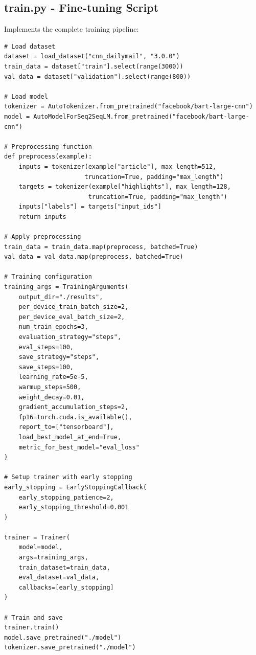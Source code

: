 \documentclass[12pt,a4paper,oneside]{report}
\begin{document}
\subsection{train.py - Fine-tuning Script}
Implements the complete training pipeline:
\begin{lstlisting}
# Load dataset
dataset = load_dataset("cnn_dailymail", "3.0.0")
train_data = dataset["train"].select(range(3000))
val_data = dataset["validation"].select(range(800))

# Load model
tokenizer = AutoTokenizer.from_pretrained("facebook/bart-large-cnn")
model = AutoModelForSeq2SeqLM.from_pretrained("facebook/bart-large-cnn")

# Preprocessing function
def preprocess(example):
    inputs = tokenizer(example["article"], max_length=512,
                      truncation=True, padding="max_length")
    targets = tokenizer(example["highlights"], max_length=128,
                       truncation=True, padding="max_length")
    inputs["labels"] = targets["input_ids"]
    return inputs

# Apply preprocessing
train_data = train_data.map(preprocess, batched=True)
val_data = val_data.map(preprocess, batched=True)

# Training configuration
training_args = TrainingArguments(
    output_dir="./results",
    per_device_train_batch_size=2,
    per_device_eval_batch_size=2,
    num_train_epochs=3,
    evaluation_strategy="steps",
    eval_steps=100,
    save_strategy="steps",
    save_steps=100,
    learning_rate=5e-5,
    warmup_steps=500,
    weight_decay=0.01,
    gradient_accumulation_steps=2,
    fp16=torch.cuda.is_available(),
    report_to=["tensorboard"],
    load_best_model_at_end=True,
    metric_for_best_model="eval_loss"
)

# Setup trainer with early stopping
early_stopping = EarlyStoppingCallback(
    early_stopping_patience=2,
    early_stopping_threshold=0.001
)

trainer = Trainer(
    model=model,
    args=training_args,
    train_dataset=train_data,
    eval_dataset=val_data,
    callbacks=[early_stopping]
)

# Train and save
trainer.train()
model.save_pretrained("./model")
tokenizer.save_pretrained("./model")
\end{lstlisting}
\end{document}
